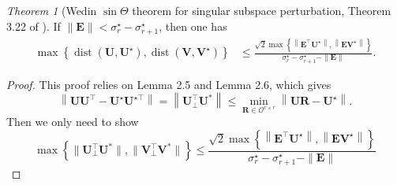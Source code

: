 \documentclass[12pt]{article}
\theoremstyle{remark}
\newcommand{\bs}[1]{{\boldsymbol{#1}^*}}
\newcommand{\bb}[1]{{\boldsymbol {#1}}}
\newtheorem{theorem}{Theorem}
\begin{document}
\begin{theorem}[Wedin  $\sin \Theta$ theorem for singular subspace perturbation, Theorem 3.22 of \cite{Chen:2021}]
If $\|\boldsymbol{E}\|<\sigma_r^{\star}-\sigma_{r+1}^{\star}$, then one has
$$
\begin{aligned}
\max \left\{\operatorname{dist}\left(\boldsymbol{U}, \boldsymbol{U}^{\star}\right), \operatorname{dist}\left(\boldsymbol{V}, \boldsymbol{V}^{\star}\right)\right\} & \leq \frac{\sqrt{2} \max \left\{\left\|\boldsymbol{E}^{\top} \boldsymbol{U}^{\star}\right\|,\left\|\boldsymbol{E} \boldsymbol{V}^{\star}\right\|\right\}}{\sigma_r^{\star}-\sigma_{r+1}^{\star}-\|\boldsymbol{E}\|}.
\end{aligned}
$$
\end{theorem}

\begin{proof}
This proof relies on Lemma 2.5 and Lemma 2.6, which gives
\begin{equation}
\left\|\boldsymbol{U} \boldsymbol{U}^{\top}-\boldsymbol{U}^{\star} \boldsymbol{U}^{\star \top}\right\|
=\left\|\boldsymbol{U}_{\perp}^{\top} \bs U\right\|
 \leq \min _{\bb R \in \mathcal{O}^{r \times r} }\left\|\boldsymbol{U} \bb R-\boldsymbol{U}^{\star}\right\| .
\end{equation}
Then we only need to show
\[
\max \left\{
\|\boldsymbol{U}_{\perp}^{\top} \bs U\|
, \|\boldsymbol{V}_{\perp}^{\top} \bs V\|
\right\} 
\leq \frac{\sqrt{2} \max \left\{\left\|\boldsymbol{E}^{\top} \boldsymbol{U}^{\star}\right\|,\left\|\boldsymbol{E} \boldsymbol{V}^{\star}\right\|\right\}}{\sigma_r^{\star}-\sigma_{r+1}^{\star}-\|\boldsymbol{E}\|}
\]
\end{proof}







 
\end{document}
